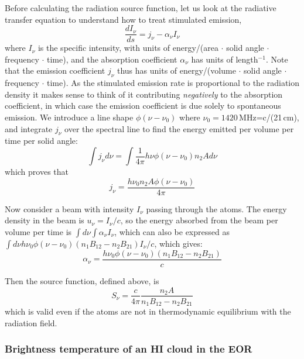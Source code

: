 Before calculating the radiation source function, let us look at the radiative transfer equation to understand how to treat stimulated emission,
\begin{equation}
\frac{dI_\nu}{ds}=j_\nu-\alpha_\nu I_\nu
\end{equation}
where $I_\nu$ is the specific intensity, with units of energy/(area $\cdot$ solid angle $\cdot$ frequency $\cdot$ time), and the absorption coefficient $\alpha_\nu$ has units of length$^{-1}$. Note that the emission coefficient $j_\nu$ thus has units of energy/(volume $\cdot$ solid angle $\cdot$ frequency $\cdot$ time). As the stimulated emission rate is proportional to the radiation density it makes sense to think of it contributing \textit{negatively} to the absorption coefficient, in which case the emission coefficient is due solely to spontaneous emission. We introduce a line shape $\phi(\nu-\nu_0)$ where $\nu_0=1420$\,MHz=c/(21\,cm), and integrate $j_\nu$ over the spectral line to find the energy emitted per volume per time per solid angle:
\begin{equation}
\int j_\nu d\nu=\int\frac{1}{4\pi}h\nu\phi(\nu-\nu_0) n_2 Ad\nu
\end{equation}
which proves that
\begin{equation}
j_\nu=\frac{h\nu_0 n_2A\phi(\nu-\nu_0)}{4\pi}
\end{equation}

Now consider a beam with intensity $I_\nu$ passing through the atoms. The energy density in the beam is $u_\nu=I_\nu/c$, so the energy absorbed from the beam per volume per time is $\int d\nu\int\alpha_\nu I_\nu$, which can also be expressed as $\int d\nu h\nu_0\phi(\nu-\nu_0)(n_1B_{12}-n_2B_{21})I_\nu/c$, which gives:
\begin{equation}
\alpha_\nu=\frac{h\nu_0\phi(\nu-\nu_0)(n_1B_{12}-n_2B_{21})}{c}
\end{equation}

Then the source function, defined above, is
\begin{equation}
S_\nu=\frac{c}{4\pi}\frac{ n_2A}{n_1B_{12}-n_2B_{21}}
\end{equation}
which is valid even if the atoms are not in thermodynamic equilibrium with the radiation field. 

\subsubsection{Brightness temperature of an HI cloud in the EOR}

